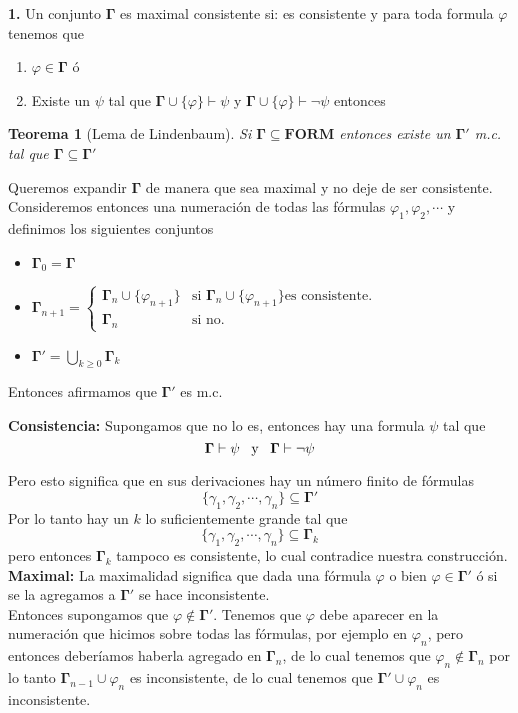 \documentclass[leqno, 12pt, twoside,letterpaper]{book}
\theoremstyle{plain}
\newtheorem{thm}{Teorema}[chapter]
\theoremstyle{definition}
\newcommand{\bgamma}[0]{\bm{\Gamma}}
\newcommand{\FORM}[0]{\bm{FORM}}
\newenvironment{solucion}[0]{\begin{adjustwidth}{1.5em}{1.5em}}{\end{adjustwidth}}
\newcommand{\twopartdef}[4]
{
	\left\{
		\begin{array}{ll}
			#1 & \mbox{si } #2 \\
			#3 & \mbox{} #4
		\end{array}
	\right.
}
\begin{document}
\begin{solucion}
\textbf{1.} Un conjunto $\bm{\Gamma}$ es maximal consistente si: es consistente y para toda formula $\varphi$ tenemos que
\begin{enumerate}
	\item $\varphi \in \bm\Gamma$ ó
	\item Existe un $\psi$ tal que $\bm{\Gamma} \cup \{\varphi\} \vdash \psi$  y $\bm{\Gamma} \cup \{\varphi\} \vdash \lnot\psi$ entonces
\end{enumerate}

\begin{thm}[Lema de Lindenbaum] Si $\bm{\Gamma} \subseteq \FORM$ entonces existe un $\bm{\Gamma'}$ m.c. tal que $\bm{\Gamma} \subseteq \bm{\Gamma'}$
\end{thm}

\noindent Queremos expandir $\bgamma$ de manera que sea maximal y no deje de ser consistente. Consideremos entonces una numeración de todas las fórmulas $\varphi_1, \varphi_2, \cdots$ y definimos los siguientes conjuntos

\begin{itemize}
\renewcommand\labelitemi{$\sim$}
\item $\bgamma_0 = \bgamma$
\item $\bgamma_{n+1} = 
	\twopartdef{\bgamma_n \cup \{\varphi_{n + 1}\}}{\bgamma_n \cup \{\varphi_{n + 1}\} \mbox{es consistente.}}
			   {\bgamma_n}{\mbox{si no.}}$
\item $\bgamma' = \bigcup\limits_{k \geq 0} \bgamma_k$
\end{itemize}

\noindent Entonces afirmamos que $\bgamma'$ es m.c.

\noindent \textbf{Consistencia:} Supongamos que no lo es, entonces hay una formula $\psi$ tal que 
\[\bgamma \vdash \psi \mbox{ \, y \, } \bgamma \vdash \lnot \psi\]

\noindent Pero esto significa que en sus derivaciones hay un número finito de fórmulas
\[\{\gamma_1, \gamma_2, \cdots, \gamma_n\} \subseteq \bgamma'\]
\noindent Por lo tanto hay un $k$ lo suficientemente grande tal que 
\[\{\gamma_1, \gamma_2, \cdots, \gamma_n\} \subseteq \bgamma_k\]
pero entonces $\bgamma_k$ tampoco es consistente, lo cual contradice nuestra construcción.\\
 
\noindent\textbf{Maximal:} La maximalidad significa que dada una fórmula $\varphi$ o bien $\varphi \in \bgamma'$ ó si se la agregamos a $\bgamma'$ se hace inconsistente. \\ 
\noindent Entonces supongamos que $\varphi \not\in \bgamma'$. Tenemos que $\varphi$ debe aparecer en la numeración que hicimos sobre todas las fórmulas, por ejemplo en $\varphi_n$, pero entonces deberíamos haberla agregado en $\bgamma_n$, de lo cual tenemos que $\varphi_n \not\in \bgamma_n$ por lo tanto $\bgamma_{n - 1} \cup \varphi_n$ es inconsistente, de lo cual tenemos que $\bgamma' \cup \varphi_n$ es inconsistente.

\end{solucion}
\end{document}
